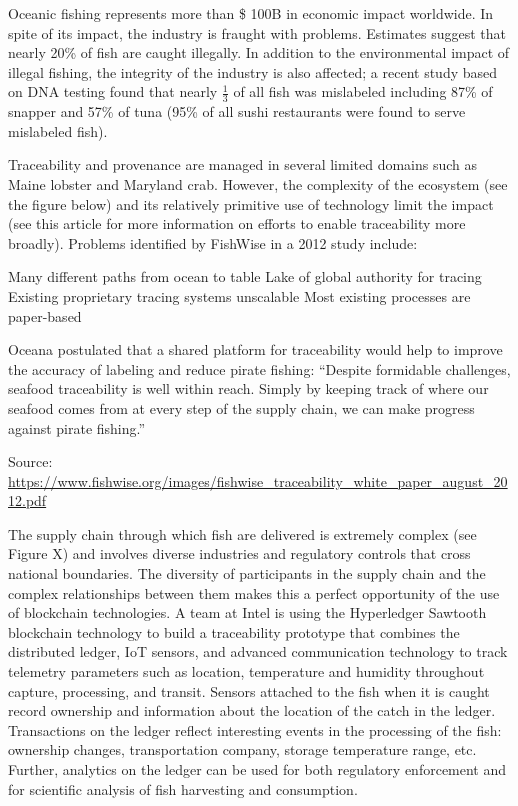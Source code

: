 Oceanic fishing represents more than \$ 100B in economic impact worldwide. In spite of its impact, the industry is fraught with problems. Estimates suggest that nearly 20\% of fish are caught illegally. In addition to the environmental impact of illegal fishing, the integrity of the industry is also affected; a recent study based on DNA testing found that nearly $\frac{1}{3}$ of all fish was mislabeled including 87\% of snapper and 57\% of tuna (95\% of all sushi restaurants were found to serve mislabeled fish).

Traceability and provenance are managed in several limited domains such as Maine lobster and Maryland crab. However, the complexity of the ecosystem (see the figure below) and its relatively primitive use of technology limit the impact (see this article for more information on efforts to enable traceability more broadly). Problems identified by FishWise in a 2012 study include:

Many different paths from ocean to table
Lake of global authority for tracing
Existing proprietary tracing systems unscalable 
Most existing processes are paper-based

Oceana postulated that a shared platform for traceability would help to improve the accuracy of labeling and reduce pirate fishing: “Despite formidable challenges, seafood traceability is well within reach. Simply by keeping track of where our seafood comes from at every step of the supply chain, we can make progress against pirate fishing.”


Source: \url{https://www.fishwise.org/images/fishwise_traceability_white_paper_august_2012.pdf}

The supply chain through which fish are delivered is extremely complex (see Figure X) and involves diverse industries and regulatory controls that cross national boundaries. The diversity of participants in the supply chain and the complex relationships between them makes this a perfect opportunity of the use of blockchain technologies. A team at Intel is using the Hyperledger Sawtooth blockchain technology to build a traceability prototype that combines the distributed ledger, IoT sensors, and advanced communication technology to track telemetry parameters such as location, temperature and humidity throughout capture, processing, and transit. Sensors attached to the fish when it is caught record ownership and information about the location of the catch in the ledger. Transactions on the ledger reflect interesting events in the processing of the fish: ownership changes, transportation company, storage temperature range, etc. Further, analytics on the ledger can be used for both regulatory enforcement and for scientific analysis of fish harvesting and consumption. 

